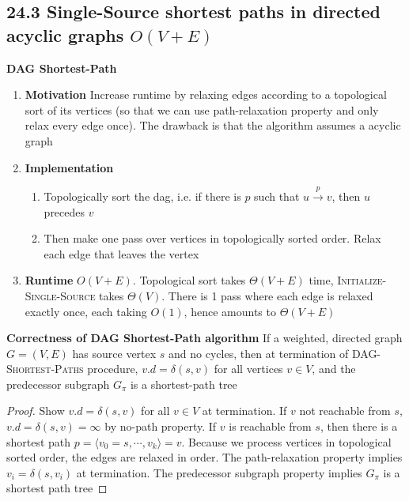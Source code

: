 \documentclass[11pt]{article}
\begin{document}
\subsection*{24.3 Single-Source shortest paths in directed acyclic graphs $O(V+E)$}


\begin{defn*}
    \textbf{DAG Shortest-Path} 
    \begin{enumerate}
        \item \textbf{Motivation} Increase runtime by relaxing edges according to a topological sort of its vertices (so that we can use path-relaxation property and only relax every edge once). The drawback is that the algorithm assumes a acyclic graph
        \item \textbf{Implementation}
        \begin{enumerate}
            \item Topologically sort the dag, i.e. if there is $p$ such that $u \xrightarrow{p} v$, then $u$ precedes $v$
            \item Then make one pass over vertices in topologically sorted order. Relax each edge that leaves the vertex
        \end{enumerate}
        \item \textbf{Runtime} $O(V+E)$. Topological sort takes $\Theta(V+E)$ time, \textsc{Initialize-Single-Source} takes $\Theta(V)$. There is 1 pass where each edge is relaxed exactly once, each taking $O(1)$, hence amounts to $\Theta(V+E)$
    \end{enumerate}
\end{defn*}



\begin{theorem*}
    \textbf{Correctness of DAG Shortest-Path algorithm} If a weighted, directed graph $G = (V,E)$ has source vertex $s$ and no cycles, then at termination of \textsc{DAG-Shortest-Paths} procedure, $v.d = \delta(s,v)$ for all vertices $v\in V$, and the predecessor subgraph $G_{\pi}$ is a shortest-path tree

    \begin{proof}
        Show $v.d = \delta(s,v)$ for all $v\in V$ at termination. If $v$ not reachable from $s$, $v.d = \delta(s,v) = \infty$ by no-path property. If $v$ is reachable from $s$, then there is a shortest path $p = \langle v_0 =s,\cdots, v_k \rangle =v$. Because we process vertices in topological sorted order, the edges are relaxed in order. The path-relaxation property implies $v_i = \delta(s, v_i)$ at termination. The predecessor subgraph property implies $G_{\pi}$ is a shortest path tree
    \end{proof}
\end{theorem*}
\end{document}
